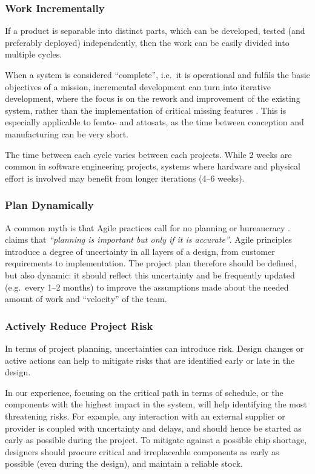 \documentclass[]{iac}
\begin{document}
\subsubsection{Work Incrementally}

If a product is separable into distinct parts, which can be developed, tested (and preferably deployed) independently, then the work can be easily divided into multiple cycles.

When a system is considered ``complete'', i.e.~it is operational and fulfils the basic objectives of a mission, incremental development can turn into iterative development, where the focus is on the rework and improvement of the existing system, rather than the implementation of critical missing features \autocite{HEEAGER201822}. This is especially applicable to femto- and attosats, as the time between conception and manufacturing can be very short.

The time between each cycle varies between each projects. While 2 weeks are common in software engineering projects, systems where hardware and physical effort is involved may benefit from longer iterations (4--6 weeks).

\subsubsection{Plan Dynamically}

A common myth is that Agile practices call for no planning or bureaucracy \autocite{douglass_agile_2015}. \textcite{douglass_agile_2015} claims that \textit{``planning is important but only if it is accurate''}. Agile principles introduce a degree of uncertainty in all layers of a design, from customer requirements to implementation. The project plan therefore should be defined, but also dynamic: it should reflect this uncertainty and be frequently updated (e.g.~every 1--2 months) to improve the assumptions made about the needed amount of work and ``velocity'' of the team.



\subsubsection{Actively Reduce Project Risk}

In terms of project planning, uncertainties can introduce risk. Design changes or active actions can help to mitigate risks that are identified early or late in the design.

In our experience, focusing on the critical path in terms of schedule, or the components with the highest impact in the system, will help identifying the most threatening risks. For example, any interaction with an external supplier or provider is coupled with uncertainty and delays, and should hence be started as early as possible during the project. To mitigate against a possible chip shortage, designers should procure critical and irreplaceable components as early as possible (even during the design), and maintain a reliable stock.
\end{document}
